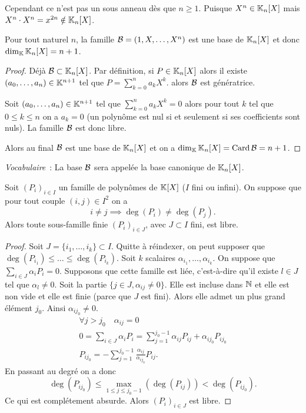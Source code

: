 Cependant ce n'est pas un sous anneau dès que \(n \geqslant 1\). Puisque \(X^n 
\in \mathbb{K}_n[X]\) mais \(X^n \cdot X^n = x^{2n} \notin \mathbb{K}_n[X]\).

\begin{prop}
  Pour tout naturel \(n\), la famille \(\mathcal{B} = (1,X, \ldots, X^n)\) est une base de 
  \(\mathbb{K}_n[X]\) et donc \(\dim_{\mathbb{K}} \mathbb{K}_n[X] = n+1\).
\end{prop}
\begin{proof}
  Déjà \(\mathcal{B} \subset \mathbb{K}_n[X]\). Par définition, si \(P \in \mathbb{K}_n[X]\) alors il 
  existe \((a_0,\ldots, a_n) \in \mathbb{K}^{n+1}\) tel que \(P = \sum_{k = 0}^n a_k X^k\). 
  alors \(\mathcal{B}\) est génératrice.

  Soit \((a_0,\ldots, a_n) \in \mathbb{K}^{n+1}\) tel que \(\sum_{k = 0}^n a_k X^k =0\) 
  alors pour tout \(k\) tel que \(0\leqslant k \leqslant n\) on a \(a_k = 0\) (un 
  polynôme est nul si et seulement si ses coefficients sont nuls). La famille 
  \(\mathcal{B}\) est donc libre.

  Alors au final \(\mathcal{B}\) est une base de \(\mathbb{K}_n[X]\) et on a \(\dim_{\mathbb{K}} 
  \mathbb{K}_n[X] = \operatorname{Card} \mathcal{B} = n+1\).
\end{proof}

\emph{Vocabulaire}~: La base \(\mathcal{B}\) sera appelée la base canonique de 
\(\mathbb{K}_n[X]\).

\begin{prop}
  Soit \((P_i)_{i \in I}\) un famille de polynômes de \(\mathbb{K}[X]\) (\(I\) fini ou 
  infini). On suppose que pour tout couple \((i,j) \in I^2\) on a
  \begin{equation}
    i \neq j \implies \deg(P_i) \neq \deg(P_j).
  \end{equation}
  Alors toute sous-famille finie \((P_i)_{i \in J}\), avec \(J \subset I\) fini, 
  est libre.
\end{prop}
\begin{proof}
  Soit \(J = \{i_1, \ldots, i_k\} \subset I\). Quitte à réindexer, on peut 
  supposer que \(\deg(P_{i_1}) \leqslant \ldots \leqslant \deg(P_{i_k})\). Soit 
  \(k\) scalaires \(\alpha_{i_1}, \ldots, \alpha_{i_k}\). On suppose que 
  \(\sum_{i \in J} \alpha_i P_i = 0\). Supposons que cette famille est liée, 
  c'est-à-dire qu'il existe \(l \in J\) tel que \(\alpha_l \neq 0\). Soit la 
  partie \(\{j \in J, \alpha_{ij} \neq 0\}\). Elle est incluse dans \(\mathbb{N}\) et 
  elle est non vide et elle est finie (parce que \(J\) est fini). Alors elle 
  admet un plus grand élément \(j_0\). Ainsi \(\alpha_{ij_0} \neq 0\).
  \begin{gather}
    \forall j > j_0 \quad \alpha_{ij} = 0 \\
    0 = \sum_{i \in J} \alpha_i P_i = \sum_{j = 1}^{j_0-1} \alpha_{ij} P_{ij} + 
    \alpha_{ij_0} P_{ij_0}\\
    P_{ij_0} = - \sum_{j = 1}^{j_0-1} \frac{\alpha_{ij}}{\alpha_{ij_0}} P_{ij}.
  \end{gather}
  En passant au degré on a donc
  \begin{equation}
    \deg(P_{ij_0}) \leqslant \max\limits_{1 \leqslant j \leqslant 
    j_0-1}(\deg(P_{ij})) < \deg(P_{ij_0}).
  \end{equation}
  Ce qui est complétement absurde. Alors \((P_i)_{i \in J}\) est libre.
\end{proof}

